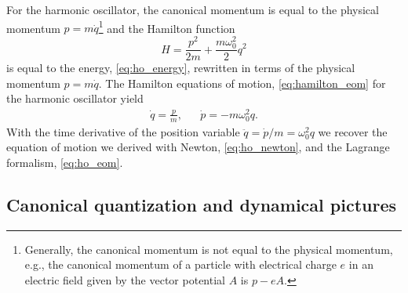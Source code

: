 For the harmonic oscillator, the canonical momentum is equal to the physical momentum $p=m\dot{q}$\footnote{Generally, the canonical momentum is not equal to the physical momentum, e.g., the canonical momentum of a particle with electrical charge $e$ in an electric field given by the vector potential $A$ is $p-eA$.} and the Hamilton function
\begin{equation}
    H
    =
    \frac{p^2}{2m}
    +
    \frac{m\omega_0^2}{2}q^2
    \label{eq:ho_hamilton}
\end{equation}
is equal to the energy, \cref{eq:ho_energy}, rewritten in terms of the physical momentum $p=m\dot{q}$.
The Hamilton equations of motion, \cref{eq:hamilton_eom} for the harmonic oscillator yield
\begin{align}
    \dot{q}
    =
    \frac{p}{m},
    &&
    \dot{p}
    =
    -m\omega_0^2q
    \label{eq:ho_hamilton_eom}.
\end{align}
With the time derivative of the position variable $\ddot{q}=\dot{p}/m=\omega_0^2q$ we recover the equation of motion we derived with Newton, \cref{eq:ho_newton}, and the Lagrange formalism, \cref{eq:ho_eom}.

\subsection{Canonical quantization and dynamical pictures}

